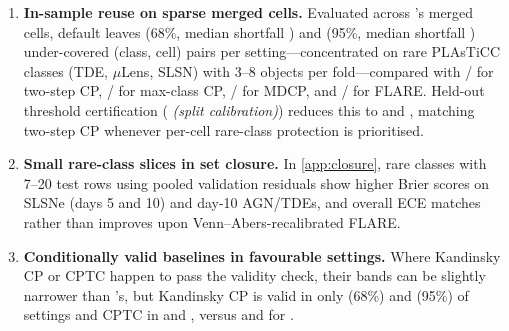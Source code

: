 \begin{enumerate}
\item \textbf{In-sample reuse on sparse merged cells.}
Evaluated across \gamut{}'s merged cells, default \gamut{} leaves \MergedGamutSixtyeight{} (68\%, median shortfall \MergedDefGamutSixtyeight{}) and \MergedGamutNinetyfive{} (95\%, median shortfall \MergedDefGamutNinetyfive{}) under-covered (class, cell) pairs per setting---concentrated on rare PLAsTiCC classes (TDE, $\mu$Lens, SLSN) with 3--8 objects per fold---compared with \MergedTwoStepSixtyeight{}/\MergedTwoStepNinetyfive{} for two-step CP, \MergedMaxClassSixtyeight{}/\MergedMaxClassNinetyfive{} for max-class CP, \MergedMDCPSixtyeight{}/\MergedMDCPNinetyfive{} for MDCP, and \MergedFlareSixtyeight{}/\MergedFlareNinetyfive{} for FLARE.
Held-out threshold certification (\emph{\gamut{} (split calibration)}) reduces this to \MergedCertSixtyeight{} and \MergedCertNinetyfive{}, matching two-step CP whenever per-cell rare-class protection is prioritised.
\item \textbf{Small rare-class slices in set closure.}
In \cref{app:closure}, rare classes with 7--20 test rows using pooled validation residuals show higher Brier scores on SLSNe (days 5 and 10) and day-10 AGN/TDEs, and overall ECE matches rather than improves upon Venn--Abers-recalibrated FLARE.
\item \textbf{Conditionally valid baselines in favourable settings.}
Where Kandinsky CP or CPTC happen to pass the validity check, their bands can be slightly narrower than \gamut{}'s, but Kandinsky CP is valid in only \MainValidKandinskySixtyeight{} (68\%) and \MainValidKandinskyNinetyfive{} (95\%) of settings and CPTC in \MainValidCPTCSixtyeight{} and \MainValidCPTCNinetyfive{}, versus \MainValidGamutSixtyeight{} and \MainValidGamutNinetyfive{} for \gamut{}.
\end{enumerate}
\FloatBarrier

\FloatBarrier

\FloatBarrier
